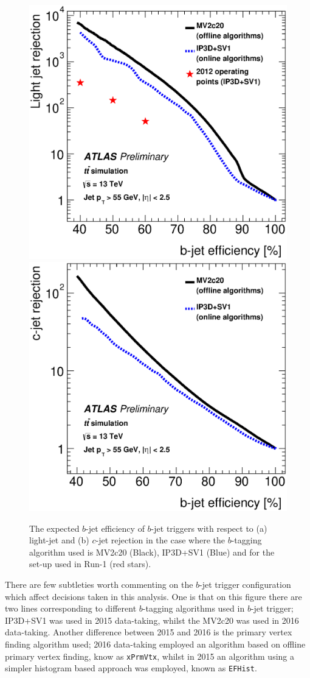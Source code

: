 \begin{figure}[!ht]
  \begin{center}
    \includegraphics[width=0.48\linewidth, angle=0]{figs/Trigger/trig-bTrig_perf_light.eps}
    \includegraphics[width=0.48\linewidth, angle=0]{figs/Trigger/trig-bTrig_perf_charm.eps}
  \end{center}
  \caption{The expected $b$-jet efficiency of $b$-jet triggers with respect to (a) light-jet and (b) $c$-jet rejection
    in the case where the $b$-tagging algorithm used is MV2c20 (Black), IP3D+SV1 (Blue) and for the set-up used in Run-1 (red stars).}
  \label{fig:trig-bTrig_perf}
\end{figure}

There are few subtleties worth commenting on the $b$-jet trigger configuration which affect decisions taken in this analysis.
One is that on this figure there are two lines corresponding to different $b$-tagging algorithms used in $b$-jet trigger;
IP3D+SV1 was used in 2015 data-taking,
whilst the MV2c20 was used in 2016 data-taking.
Another difference between 2015 and 2016 is the primary vertex finding algorithm used;
2016 data-taking employed an algorithm based on offline primary vertex finding, know as \verb|xPrmVtx|,
whilst in 2015 an algorithm using a simpler histogram based approach was employed, known as \verb|EFHist|. 

